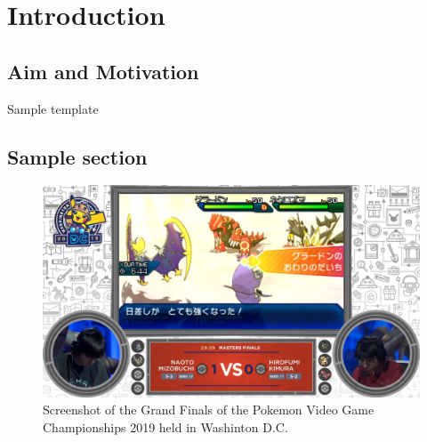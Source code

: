 \chapter{Introduction}
\section{Aim and Motivation} 
Sample template \cite{alphago}

\section{Sample section}
\begin{figure}
  \centering
  \includegraphics[width=\columnwidth]{resources/1_intro/vgc2019.png}
    \caption{Screenshot of the Grand Finals of the Pokemon Video Game Championships 2019 held in Washinton D.C.}
\end{figure}

